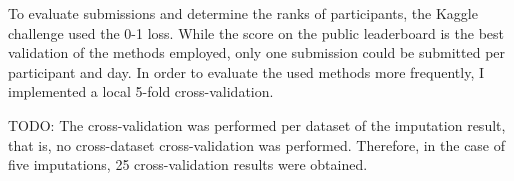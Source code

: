 To evaluate submissions and determine the ranks of participants, the
Kaggle challenge used the 0-1 loss. While the score on the public leaderboard
is the best validation of the methods employed, only one submission
could be submitted per participant and day. In order to evaluate the
used methods more frequently, I implemented a local 5-fold cross-validation. 

TODO: The cross-validation was performed per dataset of the
imputation result, that is, no cross-dataset cross-validation was
performed. Therefore, in the case of five imputations, 25
cross-validation results were obtained.